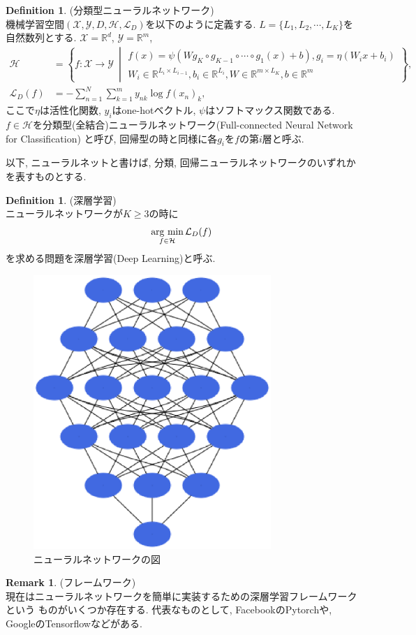 \documentclass[11pt, a4paper, dvipdfmx]{jsarticle}
\theoremstyle{definition}
\newtheorem{Definition+}[Axiom+]{Definition}
\newtheorem{Remark+}[Axiom+]{Remark}
\newcommand{\R}{\mathbb{R}}
\newcommand{\X}{\mathcal{X}}
\newcommand{\Y}{\mathcal{Y}}
\newcommand{\Hil}{\mathcal{H}}
\newcommand{\Loss}{\mathcal{L}_{D}}
\newcommand{\MLsp}{(\X, \Y, D, \Hil, \Loss)}
\newcommand{\argmin}{\mathop{\rm arg~min}\limits}
\begin{document}
\begin{Definition+}(分類型ニューラルネットワーク)\\
    機械学習空間$\MLsp$を以下のように定義する. $L = \{L_{1}, L_{2}, \cdots, L_{K}\}$を自然数列とする.
    $\X = \R^d$, $\Y = \R^{m}$, 
    \begin{align*}
        \Hil &= \left\{f:\X\to\Y~\middle|
        \begin{array}{l}
            f(x) = \psi(W g_{K}\circ g_{K - 1}\circ\cdots\circ g_{1}(x) + b), g_{i} = \eta(W_{i}x + b_{i})\\
            W_{i}\in\R^{L_{i}\times L_{i - 1}}, b_{i}\in\R^{L_{i}}, W\in\R^{m\times L_{K}}, b\in\R^{m}
        \end{array}
        \right\},\\
        \Loss(f) &= -\sum_{n = 1}^{N}\sum_{k = 1}^{m}y_{nk}\log f(x_n)_{k},
    \end{align*}
    ここで$\eta$は活性化関数, $y_{i}$はone-hotベクトル, $\psi$はソフトマックス関数である. $f\in\Hil$を分類型(全結合)ニューラルネットワーク(Full-connected Neural Network for Classification)
    と呼び, 回帰型の時と同様に各$g_{i}$を$f$の第$i$層と呼ぶ.
\end{Definition+}
以下, ニューラルネットと書けば, 分類, 回帰ニューラルネットワークのいずれかを表すものとする. 
\begin{Definition+}(深層学習)\\
    ニューラルネットワークが$K \geq 3$の時に
    \begin{align*}
        \argmin_{f\in\Hil}\Loss(f)
    \end{align*}
    を求める問題を深層学習(Deep Learning)と呼ぶ.
\end{Definition+}
\begin{figure}[H]
    \centering
    \includegraphics[width = 9.0cm, angle=90]{Images/NN.eps}
    \caption{ニューラルネットワークの図}
\end{figure}
\begin{Remark+}(フレームワーク)\\
    現在はニューラルネットワークを簡単に実装するための深層学習フレームワークという
    ものがいくつか存在する. 代表なものとして, FacebookのPytorchや, GoogleのTensorflowなどがある.
\end{Remark+}
\end{document}
